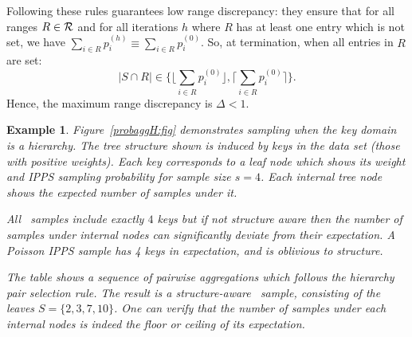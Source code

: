 \documentclass[11pt]{article}
\newtheorem{example}{Example}
\begin{document}
Following these rules guarantees low range discrepancy:
they ensure that
for all ranges $R\in\mathcal{R}$ and for all iterations $h$ where $R$ has at 
least one entry which is not set, we have 
$\sum_{i\in R} p^{(h)}_i \equiv \sum_{i\in R} p^{(0)}_i$.
So,
 at termination, 
when all entries in $R$ are set:
\[\textstyle |S\cap R| \in \{\lfloor \sum_{i\in R} p^{(0)}_i \rfloor, \lceil
\sum_{i\in R} p^{(0)}_i \rceil \}.\] 
Hence, the maximum range discrepancy is $\Delta < 1$. 

\begin{example}
Figure~\ref{probaggH:fig} demonstrates sampling when the key domain is a hierarchy.  The tree structure shown is induced by 
keys in the data set (those with positive weights).  Each key corresponds to
a leaf node which shows its weight and IPPS sampling probability for sample size $s=4$. Each internal tree node shows the expected number of samples under it.

All \varopt\ samples include exactly $4$ keys but if not
structure aware then the number of samples under internal nodes 
can significantly deviate from their expectation.
A Poisson IPPS sample has 4 keys in expectation, and is 
oblivious to structure.

The table shows a sequence of pairwise aggregations which follows
the hierarchy pair selection rule. The result is a structure-aware
\varopt\ sample, consisting of the leaves $S=\{2,3,7,10\}$. 
One can verify that the number of samples under each internal nodes is 
indeed the floor or
ceiling of its expectation.
\end{example}


\end{document}

